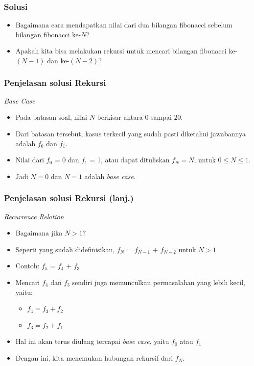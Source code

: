\begin{frame}
\frametitle{Solusi}
\begin{itemize}
  \item Bagaimana cara mendapatkan nilai dari dua bilangan fibonacci sebelum bilangan fibonacci ke-$N$?
  \item Apakah kita bisa melakukan rekursi untuk mencari bilangan fibonacci ke-$(N-1)$ dan ke-$(N-2)$?
\end{itemize}
\end{frame}

\begin{frame}
\frametitle{Penjelasan solusi Rekursi}
\textit{Base Case}
\begin{itemize}
  \item Pada batasan soal, nilai $N$ berkisar antara $0$ sampai $20$.
  \item Dari batasan tersebut, kasus terkecil yang sudah pasti diketahui jawabannya adalah $f_0$ dan $f_1$.
  \item Nilai dari $f_0$ = 0 dan $f_1$ = 1, atau dapat dituliskan $f_N = N$, untuk $0 \le N \le 1$.
  \item Jadi $N=0$ dan $N=1$ adalah \textit{base case}.
\end{itemize}
\end{frame}

\begin{frame}
\frametitle{Penjelasan solusi Rekursi (lanj.) }
\textit{Recurrence Relation}
\begin{itemize}
  \item Bagaimana jika $N > 1$?
  \item Seperti yang sudah didefinisikan, $f_N$ = $f_{N-1}$ + $f_{N-2}$ untuk $N > 1$
  \item Contoh: $f_5$ = $f_4$ + $f_3$
  \item Mencari $f_4$ dan $f_3$ sendiri juga memunculkan permasalahan yang lebih kecil, yaitu:
  \begin{itemize}
    \item $f_4 = f_3 + f_2$
    \item $f_3 = f_2 + f_1$ 
  \end{itemize}
  \item Hal ini akan terus diulang tercapai \textit{base case}, yaitu $f_0$ atau $f_1$
  \item Dengan ini, kita menemukan hubungan rekursif dari $f_N$.
\end{itemize}
\end{frame}

